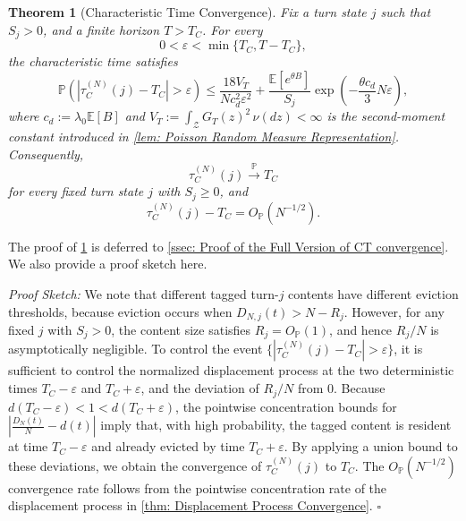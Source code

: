 \documentclass{article}
\newtheorem{theorem}{Theorem}[section]
\theoremstyle{definition}
\newcommand{\E}{\mathbb E}
\newcommand{\pro}{\mathbb P}
\begin{document}
\begin{theorem}[Characteristic Time Convergence]
\label{thm: Characteristic Time Convergence- Full}
    Fix a turn state $j$ such that $S_j>0$, and a finite horizon $T>T_C$. For every
    \begin{equation*}
        0<\varepsilon<\min\{T_C,T-T_C\},
    \end{equation*}
    the characteristic time satisfies
    \begin{equation}
        \label{equ: characteristic time finite N bound}
        \pro\left(\left|\tau_C^{(N)}(j)-T_C\right|>\varepsilon\right)
        \leq\frac{18V_T}{Nc_d^2\varepsilon^2}
        +\frac{\E[e^{\theta B}]}{S_j}\exp\left(-\frac{\theta c_d}{3}N\varepsilon\right),
    \end{equation}
    where $c_d:=\lambda_0\E[B]$ and $V_T:=\int_{\mathcal Z}G_T(z)^2\,\nu(dz)<\infty$ is the second-moment constant introduced in \cref{lem: Poisson Random Measure Representation}. Consequently,
    \begin{equation}
    \label{equ: characteristic time convergence-2}
        \tau_C^{(N)}(j)\xrightarrow{\mathbb P}T_C
    \end{equation}
    for every fixed turn state $j$ with $S_j\geq 0$, and
    \begin{equation*}
        \tau_C^{(N)}(j)-T_C=O_{\mathbb P}(N^{-1/2}).
    \end{equation*}
\end{theorem}

The proof of \cref{thm: Characteristic Time Convergence- Full} is deferred to \cref{ssec: Proof of the Full Version of CT convergence}. We also provide a proof sketch here.

\noindent\textit{Proof Sketch:} We note that different tagged turn-$j$ contents have different eviction thresholds, because eviction occurs when $D_{N,j}(t)>N-R_j$. However, for any fixed $j$ with $S_j>0$, the content size satisfies $R_j=O_{\mathbb P}(1)$, and hence $R_j/N$ is asymptotically negligible. To control the event $\{|\tau_C^{(N)}(j)-T_C|>\varepsilon\}$, it is sufficient to control the normalized displacement process at the two deterministic times $T_C-\varepsilon$ and $T_C+\varepsilon$, and the deviation of $R_j/N$ from $0$. Because $d(T_C-\varepsilon)<1<d(T_C+\varepsilon)$, the pointwise concentration bounds for $|\frac{D_N(t)}{N}-d(t)|$ imply that, with high probability, the tagged content is resident at time $T_C-\varepsilon$ and already evicted by time $T_C+\varepsilon$. By applying a union bound to these deviations, we obtain the convergence of $\tau_C^{(N)}(j)$ to $T_C$. The $O_{\mathbb P}(N^{-1/2})$ convergence rate follows from the pointwise concentration rate of the displacement process in \cref{thm: Displacement Process Convergence}. \hfill $\square$
\end{document}
